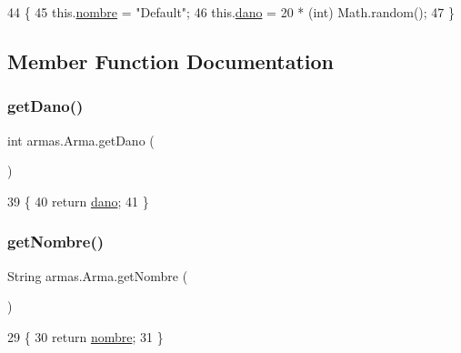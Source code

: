 \begin{DoxyCode}
44     \{
45         this.\mbox{\hyperlink{classarmas_1_1_arma_abdd717c561a99a3436dbfda8129b5581}{nombre}} = \textcolor{stringliteral}{"Default"};
46         this.\mbox{\hyperlink{classarmas_1_1_arma_a59396ee4b222360f19c8be08eb7d137b}{dano}} = 20 * (int) Math.random();
47     \}
\end{DoxyCode}


\subsection{Member Function Documentation}
\mbox{\label{classarmas_1_1_arma_ac402672c192d5341afa32760938f7e98}} 
\subsubsection{\texorpdfstring{get\+Dano()}{getDano()}}
{\footnotesize\ttfamily int armas.\+Arma.\+get\+Dano (\begin{DoxyParamCaption}{ }\end{DoxyParamCaption})\hspace{0.3cm}{\ttfamily [inline]}}


\begin{DoxyCode}
39     \{
40         \textcolor{keywordflow}{return} \mbox{\hyperlink{classarmas_1_1_arma_a59396ee4b222360f19c8be08eb7d137b}{dano}};
41     \}
\end{DoxyCode}
\mbox{\label{classarmas_1_1_arma_a6e8bac31945491dcdb38506d0d139919}} 
\subsubsection{\texorpdfstring{get\+Nombre()}{getNombre()}}
{\footnotesize\ttfamily String armas.\+Arma.\+get\+Nombre (\begin{DoxyParamCaption}{ }\end{DoxyParamCaption})\hspace{0.3cm}{\ttfamily [inline]}}


\begin{DoxyCode}
29     \{
30         \textcolor{keywordflow}{return} \mbox{\hyperlink{classarmas_1_1_arma_abdd717c561a99a3436dbfda8129b5581}{nombre}};
31     \}
\end{DoxyCode}
\mbox{\label{classarmas_1_1_arma_a2916651a71f2cdd274aafd7330a97b0b}} 
